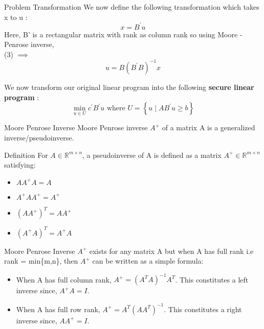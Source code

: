 \documentclass[9pt]{beamer}
\begin{document}
\begin{frame}{Problem Transformation}
We now define the following transformation which takes x to u :
\begin{equation}
x=B^{\prime} u
\end{equation}
Here, B' is a rectangular matrix with rank as column rank so using Moore - Penrose inverse, \\
(3) $ \implies $ \begin{equation}
u=B\left(B^{\prime} B\right)^{-1} x 
\end{equation}

We now transform our original linear program into the following \textbf{secure linear program} :\\
\begin{equation}
\min _{u \in U} c^{\prime} B^{\prime} u \text { where } U=\left\{u \mid A B^{\prime} u \geq b\right\}
\end{equation}
\end{frame}

\begin{frame}{Moore Penrose Inverse}
Moore Penrose inverse $ A^{+} $ of a matrix A is a generalized inverse/pseudoinverse. 

\begin{block}{Definition}
For $ A \in \mathbb{R}^{m \times n} $, a pseudoinverse of A is defined as a matrix $ A^{+} \in \mathbb{R}^{m \times n} $ satisfying:
\begin{itemize}
    \item $ A A^{+} A = A $
    \item $ A^{+} A A^{+} = A^{+} $
    \item $ (A A^{+})^{T} = A A^{+} $
    \item $ (A^{+} A)^{T} = A^{+} A $
\end{itemize}
\end{block}
\end{frame}

\begin{frame}{Moore Penrose Inverse}
$ A^{+} $ exists for any matrix A but when A has full rank i.e rank = min\{m,n\}, then $ A^{+} $ can be written as a simple formula:\\

\vspace{0.1cm}
\begin{itemize}
    \item When A has full column rank, $ A^{+} = (A^{T} A)^{-1} A^{T} $. This constitutes a left inverse since, $ A^{+} A = I $.
    
    \item When A has full row rank, $ A^{+} = A^{T} (A A^{T})^{-1} $. This constitutes a right inverse since, $ A A^{+} = I $.
\end{itemize}
\end{frame}
\end{document}
